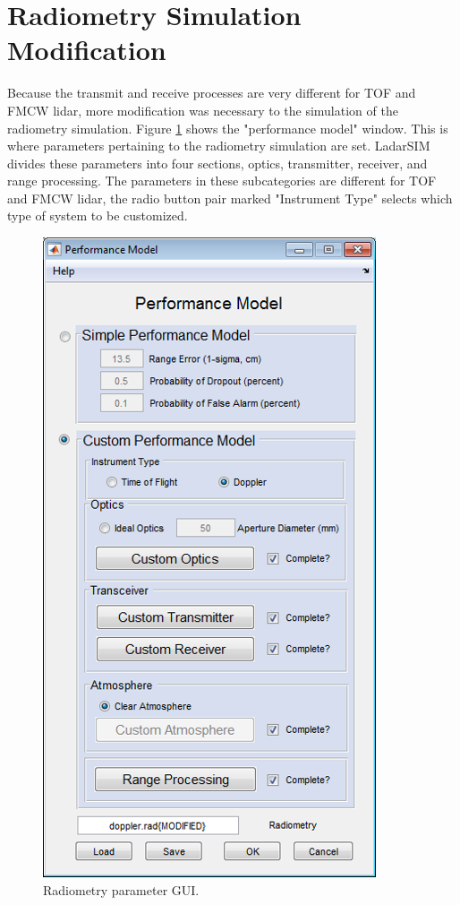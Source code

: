 \section{Radiometry Simulation Modification}
Because the transmit and receive processes are very different for TOF and FMCW lidar, more modification
was necessary to the simulation of the radiometry simulation. Figure \ref{fig:radParam} shows the "performance model"
window. This is where parameters pertaining to the radiometry simulation are set. LadarSIM divides these parameters into
four sections, optics, transmitter, receiver, and range processing. The parameters in these subcategories are different 
for TOF and FMCW lidar, the radio button pair marked "Instrument Type" selects which type of system to be customized. 
\begin{figure}[!htb]
	\centering
	\includegraphics[width=.5\columnwidth]{figs/radParamGUI}
	\vspace{1em}
	\caption{Radiometry parameter GUI.}
	\label{fig:radParam}
\end{figure}  

